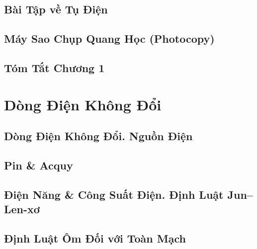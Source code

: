 \documentclass[oneside]{book}
\numberwithin{equation}{section}
\begin{document}

\section{Bài Tập về Tụ Điện}


\section{Máy Sao Chụp Quang Học (Photocopy)}


\section{Tóm Tắt Chương 1}


\chapter{Dòng Điện Không Đổi}

\section{Dòng Điện Không Đổi. Nguồn Điện}


\section{Pin \& Acquy}


\section{Điện Năng \& Công Suất Điện. Định Luật Jun--Len-xơ}


\section{Định Luật Ôm Đối với Toàn Mạch}
\end{document}
